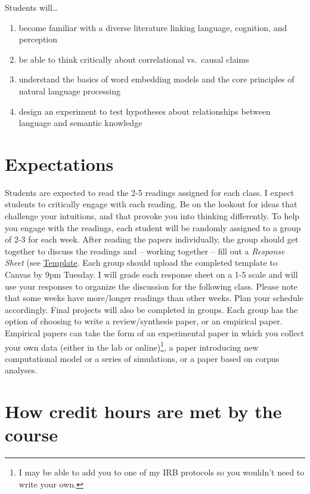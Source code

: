\documentclass[11pt,man]{article}
\begin{document}
Students will\ldots{}

\begin{enumerate}
\def\labelenumi{\arabic{enumi}.}
\item
  become familiar with a diverse literature linking language, cognition,
  and perception
\item
  be able to think critically about correlational vs.~causal claims
\item
  understand the basics of word embedding models and the core principles
  of natural language processing
\item
  design an experiment to test hypotheses about relationships between
  language and semantic knowledge
\end{enumerate}

\hypertarget{expectations}{%
\section{Expectations}\label{expectations}}

Students are expected to read the 2-5 readings assigned for each class.
I expect students to critically engage with each reading. Be on the
lookout for ideas that challenge your intuitions, and that provoke you
into thinking differently. To help you engage with the readings, each
student will be randomly assigned to a group of 2-3 for each week. After
reading the papers individually, the group should get together to
discuss the readings and -- working together -- fill out a
\emph{Response Sheet} (see
\href{https://docs.google.com/document/d/1N3eQQd40xufCTC0irJMPP7barnsBlyDQFh5fp9LLJpM/edit?usp=sharing}{Template}.
Each group should upload the completed template to Canvas by 9pm
Tuesday. I will grade each response sheet on a 1-5 scale and will use
your responses to organize the discussion for the following class.
Please note that some weeks have more/longer readings than other weeks.
Plan your schedule accordingly. Final projects will also be completed in
groups. Each group has the option of choosing to write a
review/synthesis paper, or an empirical paper. Empirical papers can take
the form of an experimental paper in which you collect your own data
(either in the lab or online)\footnote{I may be able to add you to one
  of my IRB protocols so you wouldn't need to write your own.}, a paper
introducing new computational model or a series of simulations, or a
paper based on corpus analyses.

\hypertarget{how-credit-hours-are-met-by-the-course}{%
\section{How credit hours are met by the
course}\label{how-credit-hours-are-met-by-the-course}}
\end{document}
